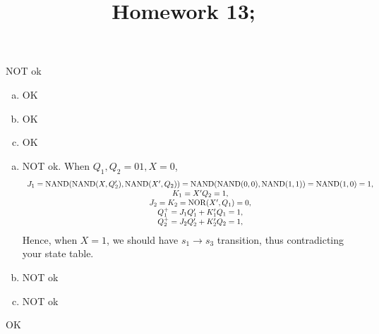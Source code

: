 \documentclass[10pt]{article} %
\title{Homework 13;
}
\newcommand{\NOR}{\operatorname{NOR}}
\newcommand{\NAND}{\operatorname{NAND}}
\begin{document}
\maketitle
{}
NOT ok
\begin{enumerate}[(a)]
  \item OK
  \item OK
  \item OK
\end{enumerate}
\begin{enumerate}[(a)]
  \item NOT ok.
    When ${Q_1,Q_2}=01,X=0$, \begin{equation*}
      \begin{array}[]{c}
        J_1=\NAND(\NAND(X,Q_2'),\NAND(X',Q_2))=\NAND(\NAND(0,0),\NAND(1,1))=\NAND(1,0)=1,\\
        K_1=X'Q_2=1,\\
        J_2=K_2=\NOR(X',Q_1)=0,\\
        Q_1^+=J_1Q_1'+K_1'Q_1=1,\\
        Q_2^+=J_2Q_2'+K_2'Q_2=1,\\
      \end{array}
    \end{equation*}
    Hence, when $X=1$, we should have $s_1\to s_3$ transition, thus contradicting your state table.
  \item NOT ok
  \item NOT ok
\end{enumerate}
OK
\end{document}
